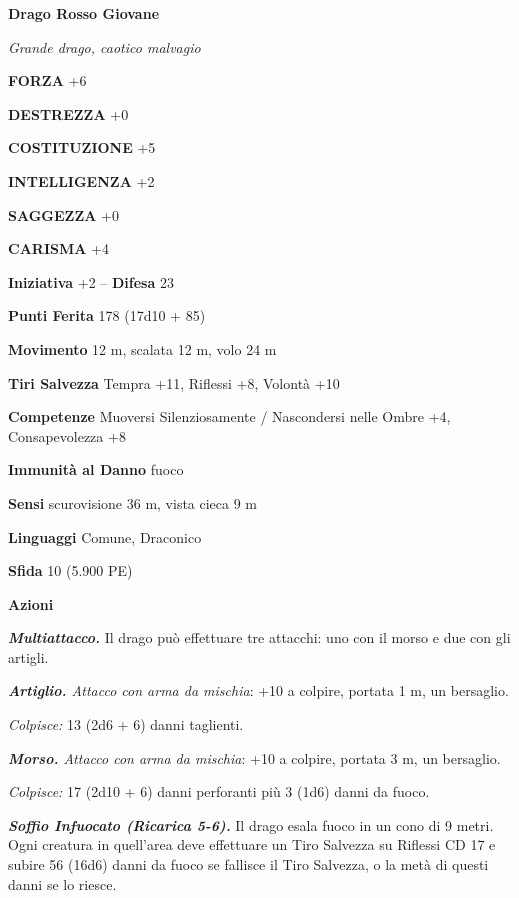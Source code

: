 \begin{multicols}{2}
\medskip{}\textbf{Drago Rosso Giovane}

\emph{Grande drago, caotico malvagio}

\textbf{FORZA} +6

\textbf{DESTREZZA} +0

\textbf{COSTITUZIONE} +5

\textbf{INTELLIGENZA} +2

\textbf{SAGGEZZA} +0

\textbf{CARISMA} +4

\textbf{Iniziativa} +2 -- \textbf{Difesa} 23

\textbf{Punti Ferita} 178 (17d10 + 85)

\textbf{Movimento} 12 m, scalata 12 m, volo 24 m

\textbf{Tiri Salvezza} Tempra +11, Riflessi +8, Volontà +10

\textbf{Competenze} Muoversi Silenziosamente / Nascondersi nelle Ombre +4, Consapevolezza +8

\textbf{Immunità al Danno} fuoco

\textbf{Sensi} scurovisione 36 m, vista cieca 9 m

\textbf{Linguaggi} Comune, Draconico

\textbf{Sfida} 10 (5.900 PE)

\textbf{Azioni}

\emph{\textbf{Multiattacco.}} Il drago può effettuare tre attacchi: uno con il morso e due con gli artigli.

\emph{\textbf{Artiglio.} Attacco con arma da mischia}: +10 a colpire, portata 1 m, un bersaglio.

\emph{Colpisce:} 13 (2d6 + 6) danni taglienti.

\emph{\textbf{Morso.} Attacco con arma da mischia}: +10 a colpire, portata 3 m, un bersaglio.

\emph{Colpisce:} 17 (2d10 + 6) danni perforanti più 3 (1d6) danni da fuoco.

\emph{\textbf{Soffio Infuocato (Ricarica 5-6).}} Il drago esala fuoco in un cono di 9 metri. Ogni creatura in quell'area deve effettuare un Tiro Salvezza su Riflessi CD 17 e subire 56 (16d6) danni da fuoco se fallisce il Tiro Salvezza, o la metà di questi danni se lo riesce.


\end{multicols}
